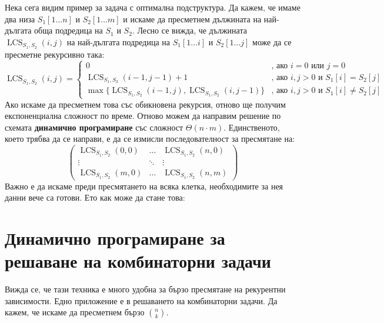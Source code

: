 Нека сега видим пример за задача с оптимална подструктура.
Да кажем, че имаме два низа $S_1[1 \dots n]$ и $S_2[1 \dots m]$ и искаме да пресметнем дължината на най-дългата обща подредица на $S_1$ и $S_2$.
Лесно се вижда, че дължината $\operatorname{LCS}_{S_1, S_2}(i, j)$ на най-дългата подредица на $S_1[1 \dots i]$ и $S_2[1 \dots j]$ може да се пресметне рекурсивно така:
\[
    \operatorname{LCS}_{S_1, S_2}(i, j) = \begin{cases}
        0                                                                                          & \text{, ако } i = 0 \text{ или } j = 0               \\
        \operatorname{LCS}_{S_1, S_2}(i - 1, j - 1) + 1                                            & \text{, ако } i, j > 0 \text{ и } S_1[i] = S_2[j]    \\
        \max\{ \operatorname{LCS}_{S_1, S_2}(i - 1, j), \operatorname{LCS}_{S_1, S_2}(i, j - 1) \} & \text{, ако } i, j > 0 \text{ и } S_1[i] \neq S_2[j]
    \end{cases}
\]
Ако искаме да пресметнем това със обикновена рекурсия, отново ще получим експоненциална сложност по време.
Отново можем да направим решение по схемата \textbf{динамично програмиране} със сложност $\Theta(n \cdot m)$.
Единственото, което трябва да се направи, е да се измисли последователност за пресмятане на:
\[
    \begin{pmatrix}
        \operatorname{LCS}_{S_1, S_2}(0, 0) & \dots  & \operatorname{LCS}_{S_1, S_2}(n, 0) \\
        \vdots                              & \ddots & \vdots                              \\
        \operatorname{LCS}_{S_1, S_2}(m, 0) & \dots  & \operatorname{LCS}_{S_1, S_2}(n, m)
    \end{pmatrix}
\]
Важно е да искаме преди пресмятането на всяка клетка, необходимите за нея данни вече са готови.
Ето как може да стане това:


\section{Динамично програмиране за решаване на комбинаторни задачи}

Вижда се, че тази техника е много удобна за бързо пресмятане на рекурентни зависимости.
Едно приложение е в решаването на комбинаторни задачи.
Да кажем, че искаме да пресметнем бързо ${n \choose k}$.

